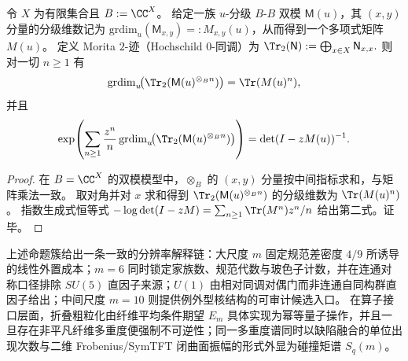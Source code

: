 \begin{proposition}\label{prop:conclusion-morita-2trace-determinant-zeta}
令 \(X\) 为有限集合且 \(B:=\CC^X\)。
给定一族 \(u\)-分级 \(B\text{-}B\) 双模 \(\mathsf{M}(u)\)，其 \((x,y)\) 分量的分级维数记为
\(\mathrm{grdim}_u(\mathsf{M}_{x,y})=:M_{x,y}(u)\)，从而得到一个多项式矩阵 \(M(u)\)。
定义 Morita \(2\)-迹（Hochschild \(0\)-同调）为
\(
\Tr_2(\mathsf{N}):=\bigoplus_{x\in X}\mathsf{N}_{x,x}.
\)
则对一切 \(n\ge 1\) 有
\[
\mathrm{grdim}_u\!\bigl(\Tr_2(\mathsf{M}(u)^{\otimes_B n})\bigr)=\Tr(M(u)^n),
\]
并且
\[
\exp\!\left(\sum_{n\ge 1}\frac{z^n}{n}\,
\mathrm{grdim}_u\!\bigl(\Tr_2(\mathsf{M}(u)^{\otimes_B n})\bigr)\right)
=\det(I-zM(u))^{-1}.
\]
\end{proposition}
\begin{proof}
在 \(B=\CC^X\) 的双模模型中，\(\otimes_B\) 的 \((x,y)\) 分量按中间指标求和，与矩阵乘法一致。
取对角并对 \(x\) 求和得到 \(\Tr_2(\mathsf{M}(u)^{\otimes_B n})\) 的分级维数为 \(\Tr(M(u)^n)\)。
指数生成式恒等式 \(-\log\det(I-zM)=\sum_{n\ge 1}\Tr(M^n)z^n/n\) 给出第二式。证毕。
\end{proof}

\begin{remark}[分辨率尺度下的统一读法]\label{rem:conclusion-resolution-scale-unified-reading}
上述命题簇给出一条一致的分辨率解释链：大尺度 \(m\) 固定规范差密度 \(4/9\) 所诱导的线性外置成本；\(m=6\) 同时锁定家族数、规范代数与玻色子计数，并在连通对称口径排除 \(SU(5)\) 直因子来源；\(U(1)\) 由相对同调对偶门而非连通自同构群直因子给出；中间尺度 \(m=10\) 则提供例外型核结构的可审计候选入口。
在算子接口层面，折叠粗粒化由纤维平均条件期望 \(E_m\) 具体实现为幂等量子操作，并且一旦存在非平凡纤维多重度便强制不可逆性；同一多重度谱同时以缺陷融合的单位出现次数与二维 Frobenius/SymTFT 闭曲面振幅的形式外显为碰撞矩谱 \(S_q(m)\)。
\end{remark}
